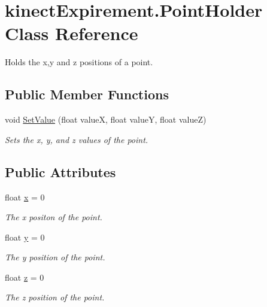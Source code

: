 \hypertarget{classkinect_expirement_1_1_point_holder}{}\section{kinect\+Expirement.\+Point\+Holder Class Reference}
\label{classkinect_expirement_1_1_point_holder}


Holds the x,y and z positions of a point.  


\subsection*{Public Member Functions}
\begin{DoxyCompactItemize}
\item 
void \hyperlink{classkinect_expirement_1_1_point_holder_a8db1e89266f09909f756e9264323a7ca}{Set\+Value} (float valueX, float valueY, float valueZ)
\begin{DoxyCompactList}\small\item\em Sets the x, y, and z values of the point. \end{DoxyCompactList}\end{DoxyCompactItemize}
\subsection*{Public Attributes}
\begin{DoxyCompactItemize}
\item 
float \hyperlink{classkinect_expirement_1_1_point_holder_a170e58cf7ad5a21dd5c7a50eafbfb0e8}{x} = 0
\begin{DoxyCompactList}\small\item\em The x positon of the point. \end{DoxyCompactList}\item 
float \hyperlink{classkinect_expirement_1_1_point_holder_a8e1920f1bd56b015aeae9f19a6f0c5e6}{y} = 0
\begin{DoxyCompactList}\small\item\em The y position of the point. \end{DoxyCompactList}\item 
float \hyperlink{classkinect_expirement_1_1_point_holder_aa89b5a93efd8f6f6eb033ea7160c5d97}{z} = 0
\begin{DoxyCompactList}\small\item\em The z position of the point. \end{DoxyCompactList}\end{DoxyCompactItemize}


